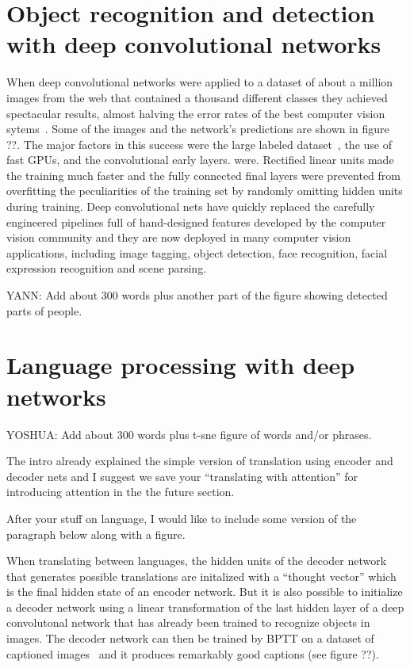 \documentclass[]{article}
\begin{document}
\section{Object recognition and detection with deep convolutional networks}

When deep convolutional networks were applied to a dataset of about a
million images from the web that contained a thousand different classes
they achieved spectacular results, almost halving the error rates of the
best computer vision sytems~\cite{kriz}.  Some of the images and the
network's predictions are shown in figure ??.  The major factors in this
success were the large labeled dataset~\cite{FeiFe}, the use of fast GPUs,
and the convolutional early layers. were.  Rectified linear units made the
training much faster and the fully connected final layers were prevented
from overfitting the peculiarities of the training set by randomly omitting
hidden units during training\cite{dropoutJMLR}. Deep convolutional nets
have quickly replaced the carefully engineered pipelines full of
hand-designed features developed by the computer vision community and they
are now deployed in many computer vision applications, including image
tagging, object detection, face recognition, facial expression recognition
and scene parsing.

YANN: Add about 300 words plus another part of the figure showing detected
parts of people.

\section{Language processing with deep networks}

YOSHUA: Add about 300 words plus t-sne figure of words and/or phrases.

The intro already explained the simple version of translation using encoder
and decoder nets and I suggest we save your ``translating with attention''
for introducing attention in the the future section.

After your stuff on language, I would like to include some version of the
paragraph below along with a figure.

When translating between languages, the hidden units of the decoder network
that generates possible translations are initalized with a ``thought
vector'' which is the final hidden state of an encoder network.  But it is
also possible to initialize a decoder network using a linear transformation
of the last hidden layer of a deep convolutonal network that has already
been trained to recognize objects in images. The decoder network can then
be trained by BPTT on a dataset of captioned
images~\cite{NIC,StanfordNIC,more?} and it produces remarkably good
captions (see figure ??).
\end{document}
